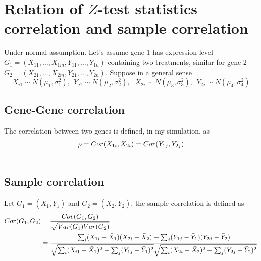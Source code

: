 \documentclass[12pt,oneside]{book}
\begin{document}
\newpage

\pagestyle{fancy}

\section*{Relation of $Z$-test statistics correlation and sample correlation}

\cfoot{}
\rhead{\thepage}

Under normal assumption. Let's assume gene 1 has expression level $G_1 = (X_{11}, \ldots, X_{1m}, Y_{11}, \ldots, Y_{1n})$ containing two treatments, similar for gene 2 $G_2 = (X_{21}, \ldots, X_{2m}, Y_{21}, \ldots, Y_{2n})$. Suppose in a general sense
\begin{equation}\label{assumption1}
  X_{i1}\sim N(\mu_1, \sigma^2_1), ~~ Y_{j1}\sim N(\mu_2, \sigma^2_2), ~~~X_{2i}\sim N(\mu_3, \sigma^2_3), ~~ Y_{2j}\sim N(\mu_4, \sigma^2_4)
\end{equation}
\subsection*{Gene-Gene correlation}
The correlation between two genes is defined, in my simulation, as 
\begin{align}\label{correlation}
\rho & = Cor(X_{1i}, X_{2i}) =  Cor(Y_{1j}, Y_{2j}) \\ \notag
\end{align}


\subsection*{Sample correlation}
Let  $\bar{G}_1 = (\bar{X}_1, \bar{Y}_1)$ and $\bar{G}_2 = (\bar{X}_2, \bar{Y}_2)$, the sample correlation is defined as  
\begin{align} \label{SampleCorrelation}
Cor(G_1, G_2) &= \frac{Cov(G_1, G_2)}{\sqrt{Var(G_1)Var(G_2)}} \\ 
&= \frac{\sum_i(X_{1i} - \bar{X}_1)(X_{2i} -\bar{X}_2) + \sum_j(Y_{1j}-\bar{Y}_1)(Y_{2j}-\bar{Y}_2)}{\sqrt{\sum_i(X_{i1}-\bar{X}_1)^2+ \sum_j(Y_{1j}-\bar{Y}_1)^2}\sqrt{\sum_i(X_{2i}-\bar{X}_2)^2 + \sum_j(Y_{2j}-\bar{Y}_2)^2}} \notag
\end{align}
\end{document}
